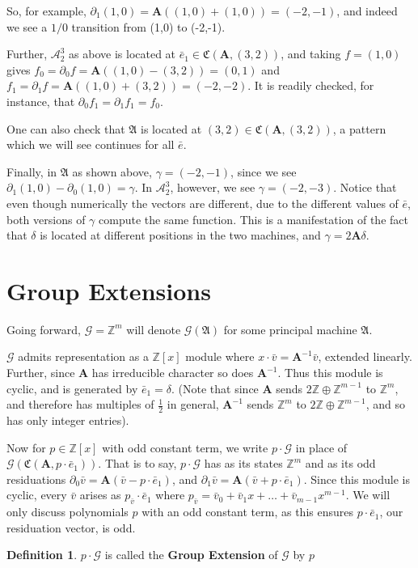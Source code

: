 \documentclass{article}
\newcommand{\A}{\mathcal{A}}
\newcommand{\G}{\mathcal{G}}
\renewcommand{\P}{\mathfrak{A}}
\newcommand{\Z}{\mathbb{Z}}
\newcommand{\2}{\textbf{2}}
\newcommand{\Am}{\textbf{A}}
\newcommand{\del}{\partial}
\newcommand{\vv}{\bar{v}}
\newcommand{\e}{\bar{e}}
\theoremstyle{definition}
\newtheorem{defn}{Definition}
\begin{document}
So, for example, $\del_1 (1,0) = \Am ((1,0) + (1,0)) = (-2,-1)$, and indeed
we see a $1/0$ transition from (1,0) to (-2,-1).

Further, $\A^3_2$ as above is located at 
$\e_1 \in \mathfrak{C}( \Am, (3,2) )$,
and taking $f = (1,0)$ gives 
$f_0 = \del_0 f = \Am((1,0) - (3,2)) = (0,1)$ and
$f_1 = \del_1 f = \Am((1,0) + (3,2)) = (-2,-2)$. It is 
readily checked, for instance, that $\del_0 f_1 = \del_1 f_1 = f_0$.

One can also check that $\P$ is located at 
$(3,2) \in \mathfrak{C}( \Am, (3,2) )$,
a pattern which we will see continues for all $\e$.

Finally, in $\P$ as shown above, $\gamma = (-2,-1)$, since
we see $\del_1 (1,0) - \del_0 (1,0) = \gamma$. In $\A^3_2$, however, 
we see $\gamma = (-2,-3)$. Notice that even though numerically the vectors 
are different, due to the different values of $\e$, both versions of 
$\gamma$ compute the same function. This is a manifestation of the fact
that $\delta$ is located at different positions in the two machines, and
$\gamma = 2 \Am \delta$.

\newpage
\section{Group Extensions}
Going forward, $\G = \Z^m$ will denote $\G(\P)$ for some principal machine $\P$.

$\G$ admits representation as a $\Z[x]$ module where 
$x \cdot \vv = \Am^{-1}\vv$, extended linearly. Further, since $\Am$ has 
irreducible character so does $\Am^{-1}$. Thus this module is cyclic, 
and is generated by $\e_1 = \delta$. 
(Note that since $\Am$ sends $2\Z \oplus \Z^{m-1}$ to $\Z^m$, and therefore
has multiples of $\frac{1}{2}$ in general, $\Am^{-1}$ sends $\Z^m$ to 
$2\Z \oplus \Z^{m-1}$, and so has only integer entries).

Now for $p \in \Z[x]$ with odd constant term, we write
$p \cdot \G$ in place of\\ $\G(\mathfrak{C}(\Am,p \cdot \e_1))$.
That is to say, $p \cdot \G$ has as its states $\Z^m$ and as its 
odd residuations
$\del_0 \vv = \Am (\vv - p \cdot \e_1)$, and 
$\del_1 \vv = \Am (\vv + p \cdot \e_1)$.
Since this module is cyclic, every $\vv$ arises as 
$p_{\vv} \cdot \e_1$ where 
$p_{\vv} = \vv_0 + \vv_1 x + \ldots + \vv_{m-1} x^{m-1}$.
We will only discuss polynomials $p$ with an odd constant term, as 
this ensures $p \cdot \e_1$, our residuation vector, is odd.

\begin{defn}
  $p \cdot \G$ is called the \textbf{Group Extension} of $\G$ by $p$
\end{defn}
\end{document}
